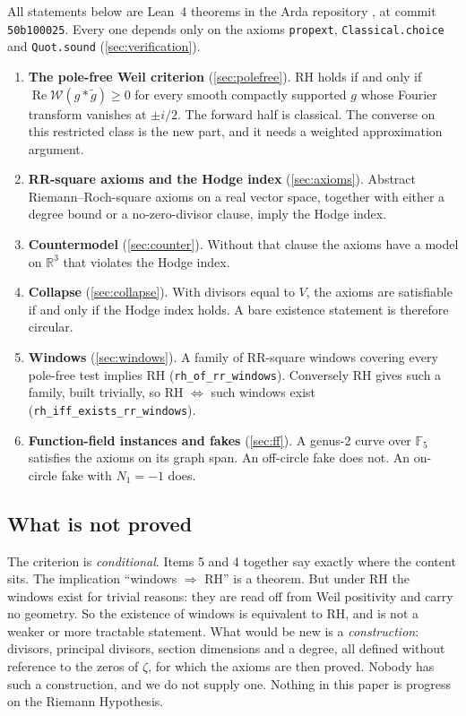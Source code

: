 \documentclass[11pt]{article}
\theoremstyle{definition}
\newcommand{\lean}[1]{\texttt{#1}}
\newcommand{\re}{\operatorname{Re}}
\newcommand{\R}{\mathbb{R}}
\newcommand{\F}{\mathbb{F}}
\newcommand{\Weil}{\mathcal{W}}
\begin{document}
All statements below are Lean~4 theorems in the Arda repository \cite{Arda}, at commit \lean{50b100025}. Every one depends only on the axioms \lean{propext}, \lean{Classical.choice} and \lean{Quot.sound} (\cref{sec:verification}).

\begin{enumerate}[leftmargin=*]
\item \textbf{The pole-free Weil criterion} (\cref{sec:polefree}). RH holds if and only if $\re \Weil(g * \tilde g) \ge 0$ for every smooth compactly supported $g$ whose Fourier transform vanishes at $\pm i/2$. The forward half is classical. The converse on this restricted class is the new part, and it needs a weighted approximation argument.
\item \textbf{RR-square axioms and the Hodge index} (\cref{sec:axioms}). Abstract Riemann--Roch-square axioms on a real vector space, together with either a degree bound or a no-zero-divisor clause, imply the Hodge index.
\item \textbf{Countermodel} (\cref{sec:counter}). Without that clause the axioms have a model on $\R^3$ that violates the Hodge index.
\item \textbf{Collapse} (\cref{sec:collapse}). With divisors equal to $V$, the axioms are satisfiable if and only if the Hodge index holds. A bare existence statement is therefore circular.
\item \textbf{Windows} (\cref{sec:windows}). A family of RR-square windows covering every pole-free test implies RH (\lean{rh\_of\_rr\_windows}). Conversely RH gives such a family, built trivially, so RH $\Leftrightarrow$ such windows exist (\lean{rh\_iff\_exists\_rr\_windows}).
\item \textbf{Function-field instances and fakes} (\cref{sec:ff}). A genus-2 curve over $\F_5$ satisfies the axioms on its graph span. An off-circle fake does not. An on-circle fake with $N_1 = -1$ does.
\end{enumerate}

\subsection{What is not proved}

The criterion is \emph{conditional}. Items 5 and 4 together say exactly where the content sits. The implication ``windows $\Rightarrow$ RH'' is a theorem. But under RH the windows exist for trivial reasons: they are read off from Weil positivity and carry no geometry. So the existence of windows is equivalent to RH, and is not a weaker or more tractable statement. What would be new is a \emph{construction}: divisors, principal divisors, section dimensions and a degree, all defined without reference to the zeros of $\zeta$, for which the axioms are then proved. Nobody has such a construction, and we do not supply one. Nothing in this paper is progress on the Riemann Hypothesis.
\end{document}

